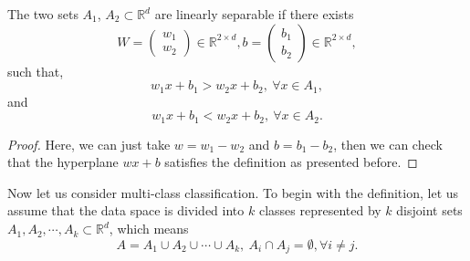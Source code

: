 \begin{lemma}\label{lem:2class}
  The two sets $A_1$, $A_2\subset \mathbb{R}^d$ are linearly separable
 if there exists 
  \begin{equation}
    \label{Wb}
W=
\begin{pmatrix}
  w_1\\
w_2
\end{pmatrix}
\in \mathbb{R}^{2\times d}, 
b=
\begin{pmatrix}
  b_1\\
b_2
\end{pmatrix}
\in \mathbb{R}^{2\times d}, 
\end{equation}
such that,  %
\begin{equation}
\label{eq:3}
 w_1x+b_1 > w_2x+b_2,\ \forall x\in A_1,
 \end{equation}
and
\begin{equation}
\label{eq:3}
 w_1x+b_1 < w_2x+b_2,\ \forall x\in A_2.
 \end{equation}
\end{lemma}

\begin{proof}
	Here, we can just take $w = w_1 - w_2$ and $b = b_1 - b_2$, 
	then we can check that the hyperplane $wx + b$ satisfies the
	definition as presented before.
\end{proof}


Now let us consider multi-class classification.
To begin with the definition, let us assume that the data space is 
divided into $k$ classes represented by $k$ disjoint sets $A_1,A_2,\cdots,A_k\subset \mathbb{R}^d$, which means
\begin{equation}
A = A_1\cup A_2\cup \cdots \cup A_k, ~A_i\cap A_j = \emptyset, \forall i \neq j.
\end{equation}

